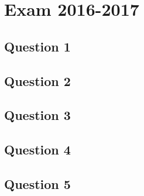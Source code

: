 \section{Exam 2016-2017}

\subsection{Question 1}
\subsection{Question 2}
\subsection{Question 3}
\subsection{Question 4}
\subsection{Question 5}